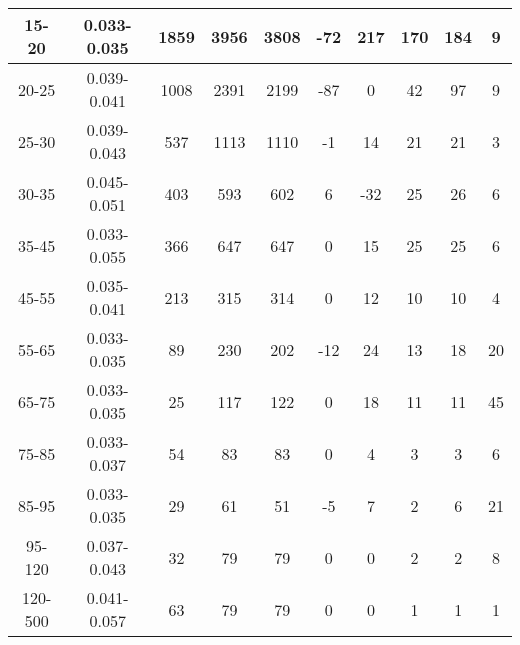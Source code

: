 \documentclass{beamer}
\begin{document}
\begin{frame}
\begin{table}[h]
\begin{center}
\begin{tabular}{|c|c|c|c|c|c|c|c|c|c|}
    15-20 & 0.033-0.035 & 1859 & 3956 & 3808 & -72 & 217 & 170 & 184 & 9  \\ \hline
    20-25 & 0.039-0.041 & 1008 & 2391 & 2199 & -87 & 0 & 42 & 97 & 9  \\ \hline
    25-30 & 0.039-0.043 & 537 & 1113 & 1110 & -1 & 14 & 21 & 21 & 3  \\ \hline
    30-35 & 0.045-0.051 & 403 & 593 & 602 & 6 & -32 & 25 & 26 & 6  \\ \hline
    35-45 & 0.033-0.055 & 366 & 647 & 647 & 0 & 15 & 25 & 25 & 6  \\ \hline
    45-55 & 0.035-0.041 & 213 & 315 & 314 & 0 & 12 & 10 & 10 & 4  \\ \hline
    55-65 & 0.033-0.035 & 89 & 230 & 202 & -12 & 24 & 13 & 18 & 20  \\ \hline
    65-75 & 0.033-0.035 & 25 & 117 & 122 & 0 & 18 & 11 & 11 & 45  \\ \hline
    75-85 & 0.033-0.037 & 54 & 83 & 83 & 0 & 4 & 3 & 3 & 6  \\ \hline
    85-95 & 0.033-0.035 & 29 & 61 & 51 & -5 & 7 & 2 & 6 & 21  \\ \hline
    95-120 & 0.037-0.043 & 32 & 79 & 79 & 0 & 0 & 2 & 2 & 8  \\ \hline
    120-500 & 0.041-0.057 & 63 & 79 & 79 & 0 & 0 & 1 & 1 & 1  \\ \hline
  \end{tabular}
  \label{tab:systSbVar_Meth1_ELECTRON_ZGamma_Endcap}
  \end{center}
\end{table}
\end{frame}
\end{document}
